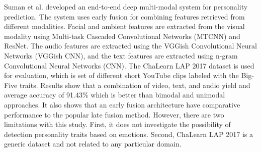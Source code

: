 Suman et al. \cite{video-interview4-SUMAN2022107715} developed an end-to-end deep multi-modal system for personality prediction. The system uses early fusion for combining features retrieved from different modalities. Facial and ambient features are extracted from the visual modality using Multi-task Cascaded Convolutional Networks (MTCNN) and ResNet. The audio features are extracted using the VGGish Convolutional Neural Networks (VGGish CNN), and the text features are extracted using n-gram Convolutional Neural Networks (CNN). The ChaLearn LAP 2017 dataset is used for evaluation, which is set of different short YouTube clips labeled with the Big-Five traits. Results show that a combination of video, text, and audio yield and average accuracy of 91.43\% which is better than bimodal and unimodal approaches. It also shows that an early fusion architecture have comparative performance to the popular late fusion method. However, there are two limitations with this study. First, it does not investigate the possibility of detection personality traits based on emotions. Second, ChaLearn LAP 2017 is a generic dataset and not related to any particular domain. \\ 





